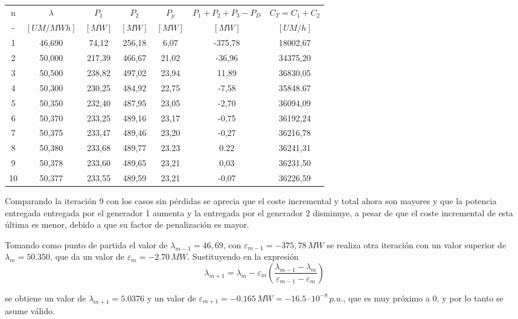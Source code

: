					\begin{table}[H]
						\centering
						\begin{tabular}{ccccccc}
							n	 & $\lambda$ & $P_1$ & $P_2$ & $P_p$ & $P_1+P_2+P_3-P_D$ & $C_T = C_1 + C_2$\\
							-	 & $[UM/MWh]$ & $[MW]$ & $[MW]$ & $[MW]$ & $[MW]$ & $[UM/h]$\\
							\hline
							1	 & 46,690	& 74,12		& 256,18	& 6,07  & -375,78	& 18002,67\\
							2	 & 50,000	& 217,39	& 466,67	& 21,02 &	-36,96	& 34375,20\\
							3	 & 50,500	& 238,82	& 497,02	& 23,94 &	11,89	& 36830,05\\
							4	 & 50,300	& 230,25	& 484,92	& 22,75 &	-7,58	& 35848.67\\
							5	 & 50,350	& 232,40	& 487,95	& 23,05 &	-2,70	& 36094,09\\
							6	 & 50,370	& 233,25	& 489,16	& 23,17 &	-0,75	& 36192,24\\
							7	 & 50,375	& 233,47	& 489,46	& 23,20 &	-0,27	& 36216,78\\
							8	 & 50,380	& 233,68	& 489,77	& 23.23 &	0.22	& 36241,31\\
							9	 & 50,378	& 233,60	& 489,65	& 23,21 &	0,03	& 36231,50\\
							10 	 & 50,377	& 233,55	& 489,59	& 23,21 &	-0,07	& 36226,59
							
						\end{tabular}
					\end{table}
					
					Comparando la iteración 9 con los casos sin pérdidas se aprecia que el coste incremental y total ahora son mayores y que la potencia entregada entregada por el generador 1 aumenta y la entregada por el generador 2 disminuye, a pesar de que el coste incremental de esta última es menor, debido a que su factor de penalización es mayor.
					
					
					Tomando como punto de partida el valor de $\lambda_{m-1} = 46,69$, con $\varepsilon_{m-1} = -375,78\,MW$ se realiza otra iteración con un valor superior de $\lambda_m = 50.350$, que da un valor de $\varepsilon_m = -2.70\,MW$. Sustituyendo en la expresión
					\[\lambda_{m+1} = \lambda_{m} - \varepsilon_m \left(\dfrac{\lambda_{m-1} - \lambda_{m}}{\varepsilon_{m-1} - \varepsilon_m}\right)\]
					
					
					se obtiene un valor de $\lambda_{m+1} = 5.0376$ y un valor de $\varepsilon_{m+1} = -0.165\,MW = -16.5\cdot 10^{-8}\,p.u.$, que es muy próximo a 0, y por lo tanto se asume válido.
			
